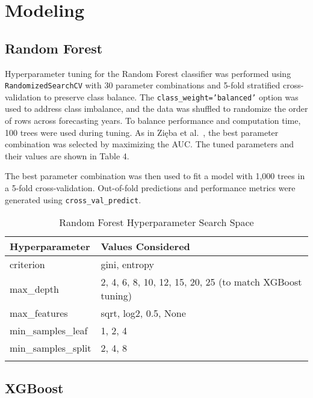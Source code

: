 \documentclass{article}      %
\begin{document}
\section{Modeling}

\subsection{Random Forest}

Hyperparameter tuning for the Random Forest classifier was performed using \texttt{RandomizedSearchCV} with 30 parameter combinations and 5-fold stratified cross-validation to preserve class balance. The \texttt{class\_weight='balanced'} option was used to address class imbalance, and the data was shuffled to randomize the order of rows across forecasting years. To balance performance and computation time, 100 trees were used during tuning. As in Zi\k{e}ba et al.~\cite{zieba2016}, the best parameter combination was selected by maximizing the AUC. The tuned parameters and their values are shown in Table 4.

The best parameter combination was then used to fit a model with 1,000 trees in a 5-fold cross-validation. Out-of-fold predictions and performance metrics were generated using \texttt{cross\_val\_predict}.

\begin{table}[!h]
    \centering
    \caption{Random Forest Hyperparameter Search Space}
    \begin{tabular}{l|l}
    \arrayrulecolor{black}  %
    \toprule
    \textbf{Hyperparameter} & \textbf{Values Considered} \\
    \midrule
    \arrayrulecolor{lightgray}
    criterion & gini, entropy \\
    \hline
    max\_depth & 2, 4, 6, 8, 10, 12, 15, 20, 25 (to match XGBoost tuning)\\
    \hline
    max\_features & sqrt, log2, 0.5, None \\
    \hline
    min\_samples\_leaf & 1, 2, 4 \\
    \hline
    min\_samples\_split & 2, 4, 8 \\
    \arrayrulecolor{black}
    \bottomrule
    \end{tabular}
    \label{table:rf_params}
\end{table}

\subsection{XGBoost}
\end{document}

